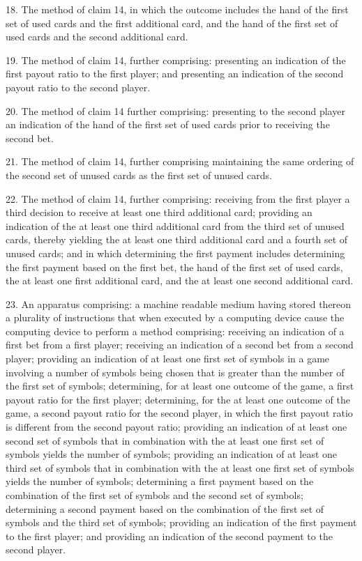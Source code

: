 \documentclass[11pt,a4paper]{article}
\begin{document}
18. The method of claim 14, in which the outcome includes the hand of the first set of used cards and the first additional card, and the hand of the first set of used cards and the second additional card.

19. The method of claim 14, further comprising: presenting an indication of the first payout ratio to the first player; and presenting an indication of the second payout ratio to the second player.

20. The method of claim 14 further comprising: presenting to the second player an indication of the hand of the first set of used cards prior to receiving the second bet.

21. The method of claim 14, further comprising maintaining the same ordering of the second set of unused cards as the first set of unused cards.

22. The method of claim 14, further comprising: receiving from the first player a third decision to receive at least one third additional card; providing an indication of the at least one third additional card from the third set of unused cards, thereby yielding the at least one third additional card and a fourth set of unused cards; and in which determining the first payment includes determining the first payment based on the first bet, the hand of the first set of used cards, the at least one first additional card, and the at least one second additional card.

23. An apparatus comprising: a machine readable medium having stored thereon a plurality of instructions that when executed by a computing device cause the computing device to perform a method comprising: receiving an indication of a first bet from a first player; receiving an indication of a second bet from a second player; providing an indication of at least one first set of symbols in a game involving a number of symbols being chosen that is greater than the number of the first set of symbols; determining, for at least one outcome of the game, a first payout ratio for the first player; determining, for the at least one outcome of the game, a second payout ratio for the second player, in which the first payout ratio is different from the second payout ratio; providing an indication of at least one second set of symbols that in combination with the at least one first set of symbols yields the number of symbols; providing an indication of at least one third set of symbols that in combination with the at least one first set of symbols yields the number of symbols; determining a first payment based on the combination of the first set of symbols and the second set of symbols; determining a second payment based on the combination of the first set of symbols and the third set of symbols; providing an indication of the first payment to the first player; and providing an indication of the second payment to the second player.
\end{document}
